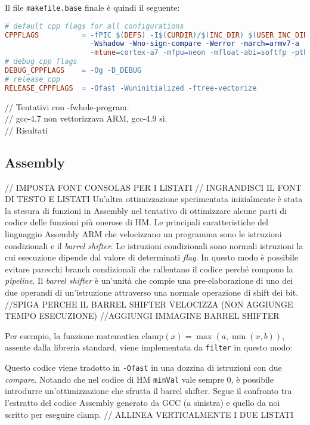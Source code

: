 Il file \verb|makefile.base| finale è quindi il seguente:\\

\begin{lstlisting}[language=make]
# default cpp flags for all configurations
CPPFLAGS          = -fPIC $(DEFS) -I$(CURDIR)/$(INC_DIR) $(USER_INC_DIRS) -Wall 
                    -Wshadow -Wno-sign-compare -Werror -march=armv7-a 
                    -mtune=cortex-a7 -mfpu=neon -mfloat-abi=softfp -pthread
# debug cpp flags
DEBUG_CPPFLAGS    = -Og -D_DEBUG
# release cpp
RELEASE_CPPFLAGS  = -Ofast -Wuninitialized -ftree-vectorize
\end{lstlisting}


// Tentativi con -fwhole-program.\\
// gcc-4.7 non vettorizzava ARM, gcc-4.9 sì.\\
// Risultati\\

\subsection{Assembly}
// IMPOSTA FONT CONSOLAS PER I LISTATI \newline
// INGRANDISCI IL FONT DI TESTO E LISTATI \newline
Un'altra ottimizzazione sperimentata inizialmente è stata
 la stesura di funzioni in Assembly nel tentativo di ottimizzare alcune parti 
 di codice delle funzioni più onerose di HM.
Le principali caratteristiche del linguaggio Assembly ARM che velocizzano un 
programma sono le istruzioni condizionali e il \emph{barrel
 	 shifter}. \newline
Le istruzioni condizionali sono normali istruzioni la cui esecuzione dipende
dal valore di determinati \emph{flag}. In questo modo è possibile evitare
parecchi branch condizionali che rallentano il codice perché rompono la
\emph{pipeline}.\newline
Il \emph{barrel shifter} è un'unità che compie una pre-elaborazione di uno dei 
due operandi di un'istruzione attraverso una normale operazione di shift dei 
bit. \newline
//SPIGA PERCHE IL BARREL SHIFTER VELOCIZZA (NON AGGIUNGE TEMPO ESECUZIONE)
//AGGIUNGI IMMAGINE BARREL SHIFTER \newline

\par Per esempio, la funzione matematica $\text{clamp}(x) = 
\max(a,\min(x,b))$, assente dalla libreria standard, viene implementata da 
\verb+filter+ in questo modo:

Questo codice viene tradotto in \verb|-Ofast| in una dozzina di istruzioni con 
due \emph{compare}. Notando che nel codice di HM \verb|minVal| vale sempre 0, è 
possibile introdurre un'ottimizzazione che sfrutta il barrel shifter. \newline
Segue il confronto tra l'estratto del codice Assembly generato da GCC (a 
sinistra) e quello da noi scritto per eseguire clamp.
// ALLINEA VERTICALMENTE I DUE LISTATI

